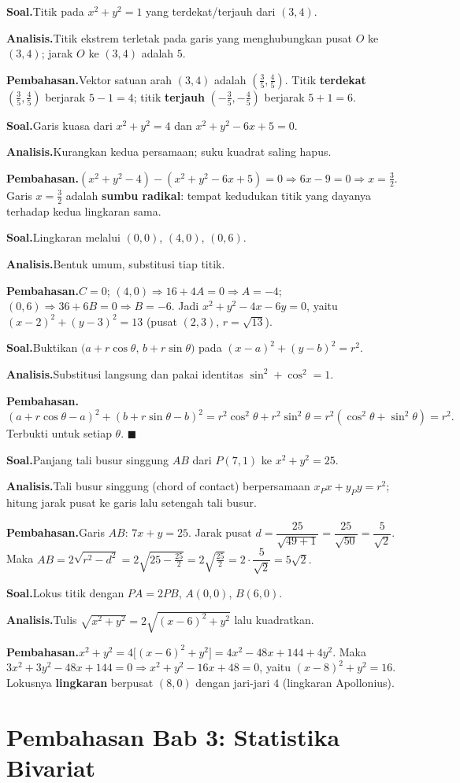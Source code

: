 \documentclass[11pt,a4paper]{report}
\theoremstyle{gaya}
\newcommand{\knomor}[1]{\par\medskip\noindent{\bfseries\color{ungu}#1}\par\nopagebreak}
\newcommand{\ksoal}{\noindent\textbf{\color{biru}Soal.}\space}
\newcommand{\kanalisis}{\par\noindent\textbf{\color{oranye}Analisis.}\space}
\newcommand{\kbahas}{\par\noindent\textbf{\color{hijau}Pembahasan.}\space}
\newcommand{\kbagian}[1]{\par\medskip\noindent{\large\bfseries\color{biru}#1}\par\smallskip}
\begin{document}
\knomor{D.2}
\ksoal Titik pada $x^2+y^2=1$ yang terdekat/terjauh dari $(3,4)$.
\kanalisis Titik ekstrem terletak pada garis yang menghubungkan pusat $O$ ke $(3,4)$; jarak $O$ ke $(3,4)$ adalah $5$.
\kbahas Vektor satuan arah $(3,4)$ adalah $\left(\tfrac35,\tfrac45\right)$. Titik \textbf{terdekat} $\left(\tfrac35,\tfrac45\right)$ berjarak $5-1=4$; titik \textbf{terjauh} $\left(-\tfrac35,-\tfrac45\right)$ berjarak $5+1=6$.

\knomor{D.3}
\ksoal Garis kuasa dari $x^2+y^2=4$ dan $x^2+y^2-6x+5=0$.
\kanalisis Kurangkan kedua persamaan; suku kuadrat saling hapus.
\kbahas $(x^2+y^2-4)-(x^2+y^2-6x+5)=0\Rightarrow6x-9=0\Rightarrow x=\tfrac32$. Garis $x=\tfrac32$ adalah \textbf{sumbu radikal}: tempat kedudukan titik yang dayanya terhadap kedua lingkaran sama.

\knomor{D.4}
\ksoal Lingkaran melalui $(0,0)$, $(4,0)$, $(0,6)$.
\kanalisis Bentuk umum, substitusi tiap titik.
\kbahas $C=0$; $(4,0)\Rightarrow16+4A=0\Rightarrow A=-4$; $(0,6)\Rightarrow36+6B=0\Rightarrow B=-6$. Jadi $x^2+y^2-4x-6y=0$, yaitu $(x-2)^2+(y-3)^2=13$ (pusat $(2,3)$, $r=\sqrt{13}$).

\knomor{D.5}
\ksoal Buktikan $\big(a+r\cos\theta,\,b+r\sin\theta\big)$ pada $(x-a)^2+(y-b)^2=r^2$.
\kanalisis Substitusi langsung dan pakai identitas $\sin^2+\cos^2=1$.
\kbahas $(a+r\cos\theta-a)^2+(b+r\sin\theta-b)^2=r^2\cos^2\theta+r^2\sin^2\theta=r^2(\cos^2\theta+\sin^2\theta)=r^2.$ Terbukti untuk setiap $\theta$. $\blacksquare$

\kbagian{Challenge Corner}

\knomor{1}
\ksoal Panjang tali busur singgung $AB$ dari $P(7,1)$ ke $x^2+y^2=25$.
\kanalisis Tali busur singgung (chord of contact) berpersamaan $x_Px+y_Py=r^2$; hitung jarak pusat ke garis lalu setengah tali busur.
\kbahas Garis $AB$: $7x+y=25$. Jarak pusat $d=\dfrac{25}{\sqrt{49+1}}=\dfrac{25}{\sqrt{50}}=\dfrac{5}{\sqrt2}$. Maka $AB=2\sqrt{r^2-d^2}=2\sqrt{25-\tfrac{25}{2}}=2\sqrt{\tfrac{25}{2}}=2\cdot\dfrac{5}{\sqrt2}=5\sqrt2.$

\knomor{2}
\ksoal Lokus titik dengan $PA=2PB$, $A(0,0)$, $B(6,0)$.
\kanalisis Tulis $\sqrt{x^2+y^2}=2\sqrt{(x-6)^2+y^2}$ lalu kuadratkan.
\kbahas $x^2+y^2=4\big[(x-6)^2+y^2\big]=4x^2-48x+144+4y^2$. Maka $3x^2+3y^2-48x+144=0\Rightarrow x^2+y^2-16x+48=0$, yaitu $(x-8)^2+y^2=16$. Lokusnya \textbf{lingkaran} berpusat $(8,0)$ dengan jari-jari $4$ (lingkaran Apollonius).

\chapter{Pembahasan Bab 3: Statistika Bivariat}
\end{document}
